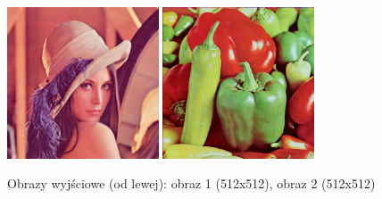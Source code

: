 \documentclass[final,a4paper,openany,12pt]{mwbk}
\begin{document}
\begin{figure}[H]
	\begin{center}
		\includegraphics[width=0.4\textwidth]{lena_color_unificationRas_result}
		\includegraphics[width=0.4\textwidth]{peppers_color_unificationRas_result}
	\end{center}
	\caption{Obrazy wyjściowe (od lewej): obraz 1 (512x512), obraz 2 (512x512)}
\end{figure}

\end{document}
